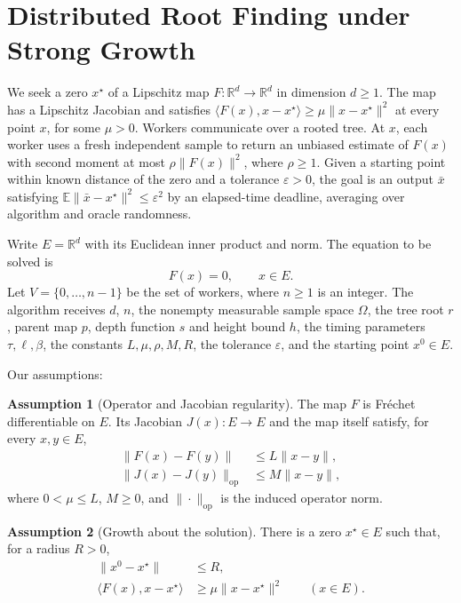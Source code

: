 \documentclass[10pt]{article}
\theoremstyle{definition}
\newtheorem{assumption}{Assumption}
\begin{document}
\section*{Distributed Root Finding under Strong Growth}
We seek a zero $x^\star$ of a Lipschitz map $F:\mathbb{R}^d\to\mathbb{R}^d$ in dimension $d\geq1$. The map has a Lipschitz Jacobian and satisfies $\langle F(x),x-x^\star\rangle\geq\mu\|x-x^\star\|^2$ at every point $x$, for some $\mu>0$. Workers communicate over a rooted tree. At $x$, each worker uses a fresh independent sample to return an unbiased estimate of $F(x)$ with second moment at most $\rho\|F(x)\|^2$, where $\rho\geq1$. Given a starting point within known distance of the zero and a tolerance $\varepsilon>0$, the goal is an output $\bar{x}$ satisfying $\mathbb{E}\|\bar{x}-x^\star\|^2\leq\varepsilon^2$ by an elapsed-time deadline, averaging over algorithm and oracle randomness.

Write $E=\mathbb{R}^d$ with its Euclidean inner product and norm. The equation to be solved is
\[
F(x)=0,\qquad x\in E.
\]
Let $V=\{0,\ldots,n-1\}$ be the set of workers, where $n\geq1$ is an integer. The algorithm receives $d$, $n$, the nonempty measurable sample space $\Omega$, the tree root $r$, parent map $p$, depth function $s$ and height bound $h$, the timing parameters $\tau,\ell,\beta$, the constants $L,\mu,\rho,M,R$, the tolerance $\varepsilon$, and the starting point $x^0\in E$.

Our assumptions:
\begin{assumption}[Operator and Jacobian regularity]
The map $F$ is Fr\'echet differentiable on $E$. Its Jacobian $J(x):E\to E$ and the map itself satisfy, for every $x,y\in E$,
\[
\begin{aligned}
\|F(x)-F(y)\| &\leq L\|x-y\|,\\
\|J(x)-J(y)\|_{\mathrm{op}} &\leq M\|x-y\|,
\end{aligned}
\]
where $0<\mu\leq L$, $M\geq0$, and $\|\cdot\|_{\mathrm{op}}$ is the induced operator norm.
\end{assumption}

\begin{assumption}[Growth about the solution]
There is a zero $x^\star\in E$ such that, for a radius $R>0$,
\[
\begin{aligned}
\|x^0-x^\star\| &\leq R,\\
\langle F(x),x-x^\star\rangle &\geq \mu\|x-x^\star\|^2 \qquad (x\in E).
\end{aligned}
\]
\end{assumption}
\end{document}
